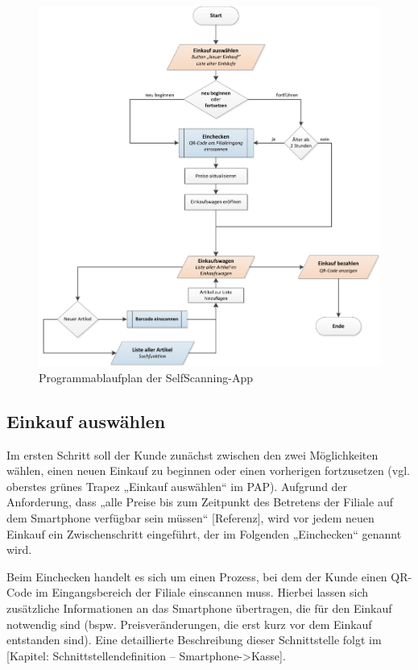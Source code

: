 \begin{figure}[H]
\includegraphics[width=\linewidth]{res/pap.pdf}
\caption{Programmablaufplan der SelfScanning-App}
\end{figure}

\subsection{Einkauf auswählen}
Im ersten Schritt soll der Kunde zunächst zwischen den zwei Möglichkeiten wählen, einen neuen Einkauf zu beginnen oder einen vorherigen fortzusetzen (vgl. oberstes grünes Trapez „Einkauf auswählen“ im PAP). Aufgrund der Anforderung, dass „alle Preise bis zum Zeitpunkt des Betretens der Filiale auf dem Smartphone verfügbar sein müssen“ [Referenz], wird vor jedem neuen Einkauf ein  Zwischenschritt eingeführt, der im Folgenden „Einchecken“ genannt wird.

Beim Einchecken handelt es sich um einen Prozess, bei dem der Kunde einen QR-Code im Eingangsbereich der Filiale einscannen muss. Hierbei lassen sich zusätzliche Informationen an das Smartphone übertragen, die für den Einkauf notwendig sind (bspw. Preisveränderungen, die erst kurz vor dem Einkauf entstanden sind). Eine detaillierte Beschreibung dieser Schnittstelle folgt im [Kapitel: Schnittstellendefinition – Smartphone->Kasse].

